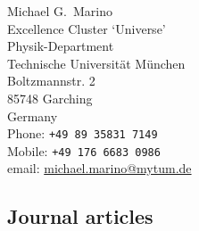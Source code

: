 \documentclass[11pt, a4paper]{article}
\newcommand{\TUM}      {Technische Universit\"{a}t M\"{u}nchen}
\begin{document}
\setlength{\parskip}{1ex}

%
\nocite{*}
%

\reversemarginpar
\textsf{\LARGE Michael G.~Marino}\\[1cm]
Excellence Cluster `Universe'\\
Physik-Department\\
\TUM\\
Boltzmannstr. 2\\
85748 Garching\\
Germany\\[.2cm]
Phone: \texttt{+49 89 35831 7149}\\
Mobile: \texttt{+49 176 6683 0986}\\[.2cm]
\def\myemail{michael.marino@mytum.de}
email: \href{mailto:\myemail}{\myemail}\\

\subsection*{Journal articles}


\end{document}
